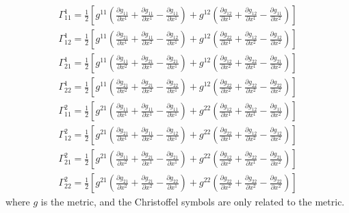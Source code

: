 \documentclass{article}
\theoremstyle{definition}
\theoremstyle{plain}
\begin{document}
\begin{align}
    \Gamma_{11}^1=\frac{1}{2}\left[ g^{11}\left(\frac{\partial  g_{11}}{\partial x^1}+\frac{\partial  g_{11}}{\partial x^1}-\frac{\partial  g_{11}}{\partial x^1}\right)+ g^{12}\left(\frac{\partial  g_{12}}{\partial x^1}+\frac{\partial  g_{12}}{\partial x^1}-\frac{\partial  g_{11}}{\partial x^2}\right)\right]\\ \nonumber
    \Gamma_{12}^1=\frac{1}{2}\left[ g^{11}\left(\frac{\partial  g_{21}}{\partial x^1}+\frac{\partial  g_{11}}{\partial x^2}-\frac{\partial  g_{12}}{\partial x^1}\right)+ g^{12}\left(\frac{\partial  g_{22}}{\partial x^1}+\frac{\partial  g_{12}}{\partial x^2}-\frac{\partial  g_{12}}{\partial x^2}\right)\right]\\ \nonumber
    \Gamma_{21}^1=\frac{1}{2}\left[ g^{11}\left(\frac{\partial  g_{11}}{\partial x^2}+\frac{\partial  g_{21}}{\partial x^1}-\frac{\partial  g_{21}}{\partial x^1}\right)+ g^{12}\left(\frac{\partial  g_{12}}{\partial x^2}+\frac{\partial  g_{22}}{\partial x^1}-\frac{\partial  g_{21}}{\partial x^2}\right)\right]\\ \nonumber
    \Gamma_{22}^1=\frac{1}{2}\left[ g^{11}\left(\frac{\partial  g_{21}}{\partial x^2}+\frac{\partial  g_{21}}{\partial x^2}-\frac{\partial  g_{22}}{\partial x^1}\right)+ g^{12}\left(\frac{\partial  g_{22}}{\partial x^2}+\frac{\partial  g_{22}}{\partial x^2}-\frac{\partial  g_{22}}{\partial x^2}\right)\right]\\ \nonumber
    \Gamma_{11}^2=\frac{1}{2}\left[ g^{21}\left(\frac{\partial  g_{11}}{\partial x^1}+\frac{\partial  g_{11}}{\partial x^1}-\frac{\partial  g_{11}}{\partial x^1}\right)+ g^{22}\left(\frac{\partial  g_{12}}{\partial x^1}+\frac{\partial  g_{12}}{\partial x^1}-\frac{\partial  g_{11}}{\partial x^2}\right)\right]\\ \nonumber
    \Gamma_{12}^2=\frac{1}{2}\left[ g^{21}\left(\frac{\partial  g_{21}}{\partial x^1}+\frac{\partial  g_{11}}{\partial x^2}-\frac{\partial  g_{12}}{\partial x^1}\right)+ g^{22}\left(\frac{\partial  g_{22}}{\partial x^1}+\frac{\partial  g_{12}}{\partial x^2}-\frac{\partial  g_{12}}{\partial x^2}\right)\right]\\ \nonumber
    \Gamma_{21}^2=\frac{1}{2}\left[ g^{21}\left(\frac{\partial  g_{11}}{\partial x^2}+\frac{\partial  g_{21}}{\partial x^1}-\frac{\partial  g_{21}}{\partial x^1}\right)+ g^{22}\left(\frac{\partial  g_{12}}{\partial x^2}+\frac{\partial  g_{22}}{\partial x^1}-\frac{\partial  g_{21}}{\partial x^2}\right)\right]\\ \nonumber
    \Gamma_{22}^2=\frac{1}{2}\left[ g^{21}\left(\frac{\partial  g_{21}}{\partial x^2}+\frac{\partial  g_{21}}{\partial x^2}-\frac{\partial  g_{22}}{\partial x^1}\right)+ g^{22}\left(\frac{\partial  g_{22}}{\partial x^2}+\frac{\partial  g_{22}}{\partial x^2}-\frac{\partial  g_{22}}{\partial x^2}\right)\right]
\end{align}
where $g$ is the metric, and the Christoffel symbols are only related to the metric. 
\end{document}
